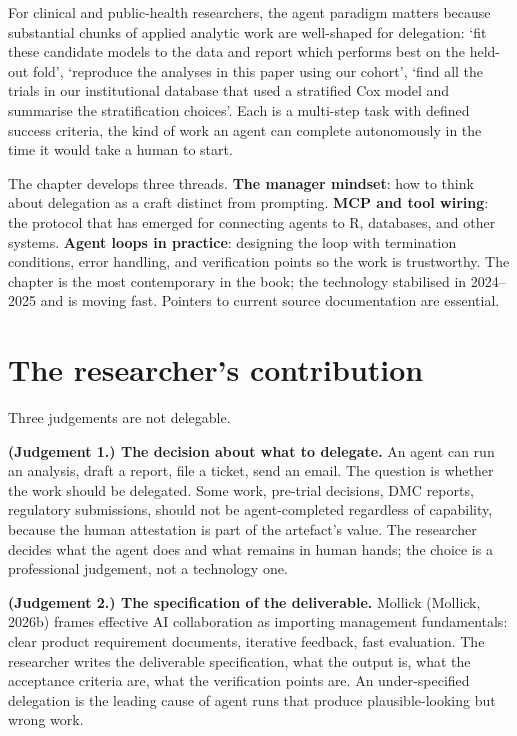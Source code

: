 \documentclass[
  letterpaper,
  11pt]{scrbook}
\begin{document}
For clinical and public-health researchers, the agent paradigm matters
because substantial chunks of applied analytic work are well-shaped for
delegation: `fit these candidate models to the data and report which
performs best on the held-out fold', `reproduce the analyses in this
paper using our cohort', `find all the trials in our institutional
database that used a stratified Cox model and summarise the
stratification choices'. Each is a multi-step task with defined success
criteria, the kind of work an agent can complete autonomously in the
time it would take a human to start.

The chapter develops three threads. \textbf{The manager mindset}: how to
think about delegation as a craft distinct from prompting. \textbf{MCP
and tool wiring}: the protocol that has emerged for connecting agents to
R, databases, and other systems. \textbf{Agent loops in practice}:
designing the loop with termination conditions, error handling, and
verification points so the work is trustworthy. The chapter is the most
contemporary in the book; the technology stabilised in 2024--2025 and is
moving fast. Pointers to current source documentation are essential.

\section{The researcher's contribution}\label{sec-agents-mcp-human}

Three judgements are not delegable.

\textbf{(Judgement 1.) The decision about what to delegate.} An agent
can run an analysis, draft a report, file a ticket, send an email. The
question is whether the work should be delegated. Some work, pre-trial
decisions, DMC reports, regulatory submissions, should not be
agent-completed regardless of capability, because the human attestation
is part of the artefact's value. The researcher decides what the agent
does and what remains in human hands; the choice is a professional
judgement, not a technology one.

\textbf{(Judgement 2.) The specification of the deliverable.} Mollick
(Mollick, 2026b) frames effective AI collaboration as importing
management fundamentals: clear product requirement documents, iterative
feedback, fast evaluation. The researcher writes the deliverable
specification, what the output is, what the acceptance criteria are,
what the verification points are. An under-specified delegation is the
leading cause of agent runs that produce plausible-looking but wrong
work.
\end{document}
